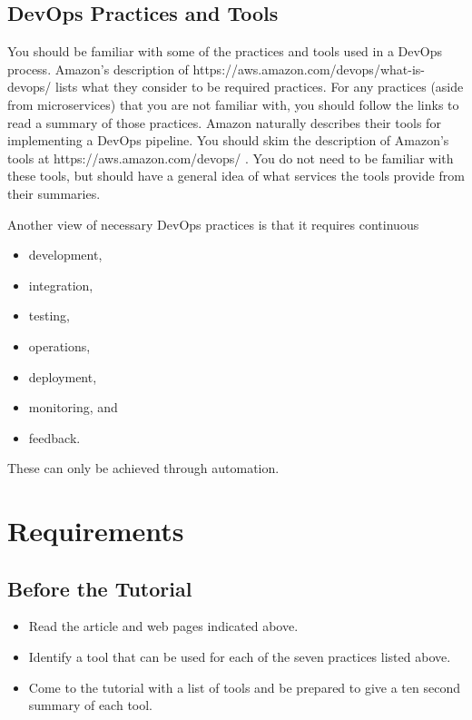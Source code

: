 \documentclass{csse4400}
\begin{document}
\subsection{DevOps Practices and Tools}\label{sec:DevOps-Practices}
You should be familiar with some of the practices and tools used in a DevOps process.
Amazon's description of 
{https://aws.amazon.com/devops/what-is-devops/} \cite{AWS-DevOps} lists what they consider to be required practices.
For any practices (aside from microservices) that you are not familiar with, you should follow the links to read a summary of those practices.
Amazon naturally describes their tools for implementing a DevOps pipeline.
You should skim the description of Amazon's tools at 
{https://aws.amazon.com/devops/} \cite{AWS-DevOps-Tools}.
You do not need to be familiar with these tools, but should have a general idea of what services the tools provide from their summaries.

\newpage
\noindent
Another view of necessary DevOps practices is that it requires continuous
\begin{itemize}[nosep]
    \item development,
    \item integration,
    \item testing,
    \item operations,
    \item deployment,
    \item monitoring, and
    \item feedback.
\end{itemize}
These can only be achieved through automation.



\section{Requirements}

\subsection*{Before the Tutorial}
\begin{itemize}
    \item Read the article and web pages indicated above.
    \item Identify a tool that can be used for each of the seven practices listed above.
    \item Come to the tutorial with a list of tools and be prepared to give a ten second summary of each tool.
\end{itemize}
\end{document}

